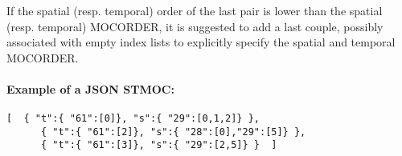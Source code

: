 If the spatial (resp. temporal) order of the last pair is lower than the spatial (resp. temporal) MOCORDER, it is suggested to add a last couple, possibly associated with empty index lists to explicitly specify the spatial and temporal MOCORDER.

\paragraph{Example of a JSON STMOC:}
\par\noindent
\begin{Verbatim}[frame=single]
   [  { "t":{ "61":[0]}, "s":{ "29":[0,1,2]} },
      { "t":{ "61":[2]}, "s":{ "28":[0],"29":[5]} },
      { "t":{ "61":[3]}, "s":{ "29":[2,5]} }  ]
\end{Verbatim}

